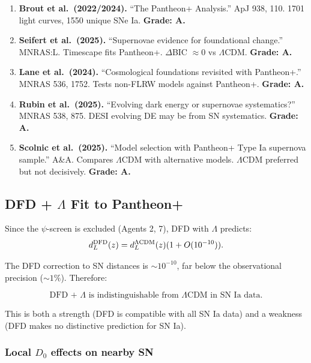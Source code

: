 \documentclass[11pt,a4paper]{article}
\begin{document}
\begin{enumerate}
\item \textbf{Brout et al.\ (2022/2024).} ``The Pantheon+ Analysis.'' ApJ 938, 110. 1701 light curves, 1550 unique SNe Ia. \textbf{Grade: A.}

\item \textbf{Seifert et al.\ (2025).} ``Supernovae evidence for foundational change.'' MNRAS:L. Timescape fits Pantheon+. $\Delta$BIC $\approx 0$ vs $\Lambda$CDM. \textbf{Grade: A.}

\item \textbf{Lane et al.\ (2024).} ``Cosmological foundations revisited with Pantheon+.'' MNRAS 536, 1752. Tests non-FLRW models against Pantheon+. \textbf{Grade: A.}

\item \textbf{Rubin et al.\ (2025).} ``Evolving dark energy or supernovae systematics?'' MNRAS 538, 875. DESI evolving DE may be from SN systematics. \textbf{Grade: A.}

\item \textbf{Scolnic et al.\ (2025).} ``Model selection with Pantheon+ Type Ia supernova sample.'' A\&A. Compares $\Lambda$CDM with alternative models. $\Lambda$CDM preferred but not decisively. \textbf{Grade: A.}
\end{enumerate}

\subsection{DFD + $\Lambda$ Fit to Pantheon+}

Since the $\psi$-screen is excluded (Agents 2, 7), DFD with $\Lambda$ predicts:
\begin{equation}
d_L^{\rm DFD}(z) = d_L^{\Lambda\text{CDM}}(z)(1 + O(10^{-10})).
\end{equation}

The DFD correction to SN distances is $\sim 10^{-10}$, far below the observational precision ($\sim 1\%$). Therefore:

\begin{equation}
\boxed{\text{DFD + }\Lambda\text{ is indistinguishable from }\Lambda\text{CDM in SN Ia data.}}
\end{equation}

This is both a strength (DFD is compatible with all SN Ia data) and a weakness (DFD makes no distinctive prediction for SN Ia).

\subsubsection{Local $D_0$ effects on nearby SN}
\end{document}

